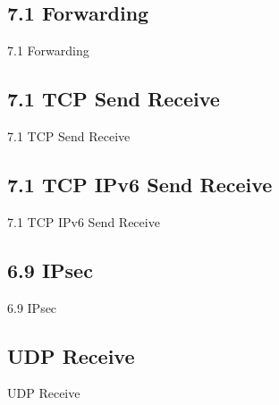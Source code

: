 \documentclass[14pt,aspectratio=169]{beamer}
\begin{document}
\subsection{7.1 Forwarding}
\begin{frame}{7.1 Forwarding}
    \begin{adjustbox}{totalheight=\baselineskip}
	
    \end{adjustbox}
\end{frame}

\subsection{7.1 TCP Send Receive}
\begin{frame}{7.1 TCP Send Receive}
    \begin{adjustbox}{totalheight=\baselineskip}
	
    \end{adjustbox}
\end{frame}

\subsection{7.1 TCP IPv6 Send Receive}
\begin{frame}{7.1 TCP IPv6 Send Receive}
    \begin{adjustbox}{totalheight=\baselineskip}
	
    \end{adjustbox}
\end{frame}

\subsection{6.9 IPsec}
\begin{frame}{6.9 IPsec}
    \begin{adjustbox}{totalheight=\baselineskip}
	
    \end{adjustbox}
\end{frame}

\subsection{UDP Receive}
\begin{frame}{UDP Receive}
    \begin{adjustbox}{totalheight=\baselineskip}
	
    \end{adjustbox}
\end{frame}
\end{document}
